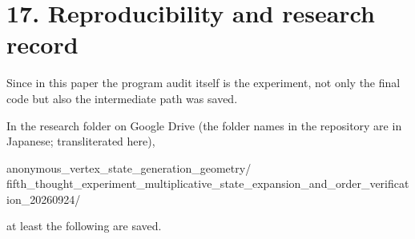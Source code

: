 \documentclass[
  a4paper,
]{article}
\newenvironment{Shaded}{}{}
\newcommand{\NormalTok}[1]{#1}
\begin{document}
\section{17. Reproducibility and research
record}\label{reproducibility-and-research-record}

Since in this paper the program audit itself is the experiment, not only
the final code but also the intermediate path was saved.

In the research folder on Google Drive (the folder names in the
repository are in Japanese; transliterated here),

\begin{Shaded}
\begin{Highlighting}[]
\NormalTok{anonymous\_vertex\_state\_generation\_geometry/}
\NormalTok{fifth\_thought\_experiment\_multiplicative\_state\_expansion\_and\_order\_verification\_20260924/}
\end{Highlighting}
\end{Shaded}

at least the following are saved.
\end{document}
